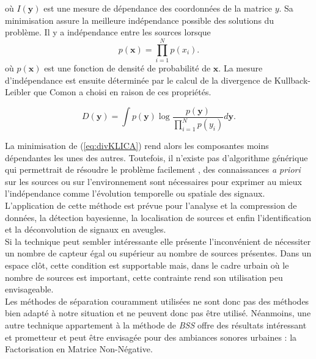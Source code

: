 où $I(\mathbf{y})$ est une mesure de dépendance des coordonnées de la matrice $y$. Sa minimisation assure la meilleure indépendance possible des solutions du problème.
Il y a indépendance entre les sources lorsque 
\begin{equation}
p(\mathbf{x}) = \prod_{i = 1}^N p(x_i).
\end{equation}
où $p(\mathbf{x})$ est une fonction de densité de probabilité de $\mathbf{x}$. La mesure d'indépendance est ensuite déterminée par le calcul de la divergence de Kullback-Leibler que Comon \cite{Comon} a choisi en raison de ces propriétés.

\begin{equation}\label{eq:divKLICA}
D(\mathbf{y}) = \int p(\mathbf{y})\log\frac{p(\mathbf{y})}{\prod_{i = 1}^N p(y_i)} d\mathbf{y}.
\end{equation}

La minimisation de (\ref{eq:divKLICA}) rend alors les composantes moins dépendantes les unes des autres. Toutefois, il n'existe pas d'algorithme générique qui permettrait de résoudre le problème facilement \cite{CichockiICA}, des connaissances \textit{a priori} sur les sources ou sur l'environnement sont nécessaires pour exprimer au mieux l'indépendance comme l'évolution temporelle ou spatiale des signaux.  \\

L'application de cette méthode est prévue pour l'analyse et la compression de données, la détection bayesienne, la localisation de sources et enfin l'identification et la déconvolution de signaux en aveugles.\\

Si la technique peut sembler intéressante elle présente l'inconvénient de nécessiter un nombre de capteur égal ou supérieur au nombre de sources présentes. Dans un espace clôt, cette condition est supportable mais, dans le cadre urbain où le nombre de sources est important, cette contrainte rend son utilisation peu envisageable.\\

Les méthodes de séparation couramment utilisées ne sont donc pas des méthodes bien adapté à notre situation et ne peuvent donc pas être utilisé. Néanmoins, une autre technique appartement à la méthode de \textit{BSS} offre des résultats intéressant et prometteur et peut être envisagée pour des ambiances sonores urbaines : la Factorisation en Matrice Non-Négative.

